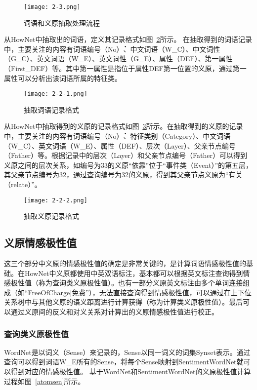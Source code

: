 \begin{figure}[htp]
\centering
\texttt{[image: 2-3.png]}
\caption{词语和义原抽取处理流程}
\label{atom}
\end{figure}

从HowNet中抽取出的词语，定义其记录格式如图~\ref{fig2-2-1}所示。
在抽取得到的词语记录中，主要关注的内容有词语编号（No\.）、中文词语（W\_C）、中文词性（G\_C）、英文词语（W\_E）、英文词性（G\_E）、属性（DEF）、第一属性（First\_DEF）等。其中第一属性是指位于属性DEF第一位置的义原，通过第一属性可以分析出该词语所属的特征类。

\begin{figure}[htp]
\centering
\texttt{[image: 2-2-1.png]}
\caption{抽取词语记录格式}
\label{fig2-2-1}
\end{figure}

从HowNet中抽取得到的义原的记录格式如图~\ref{fig2-2-2}所示。在抽取得到的义原的记录中，主要关注的内容有词语编号（No\.）、特征类别（Category）、中文词语（W\_C）、英文词语（W\_E）、属性（DEF）、层次（Layer）、父亲节点编号（Father）等。根据记录中的层次（Layer）和父亲节点编号（Father）可以得到义原之间的层次关系，如编号为33的义原“依靠”位于“事件类（Event）”的第五层，其父亲节点编号为32，通过查询编号为32的义原，得到其父亲节点义原为“有关（relate）”。

\begin{figure}[htp]
\centering
\texttt{[image: 2-2-2.png]}
\caption{抽取义原记录格式}
\label{fig2-2-2}
\end{figure}

\subsection{义原情感极性值}
这三个部分中义原的情感极性值的确定是非常关键的，是计算词语情感极性值的基础。在HowNet中义原都使用中英双语标注，基本都可以根据英文标注查询得到情感极性值（称为查询类义原极性值）。也有一部分义原英文标注由多个单词连接组成（如“FreeOfCharge$ | $免费”），无法直接查询得到情感极性值，可以通过在上下位关系树中与其他义原的语义距离进行计算获得（称为计算类义原极性值）。最后可以通过义原间的反义和对义关系对计算出的义原情感极性值进行校正。

\subsubsection{查询类义原极性值}
WordNet是以词义（Sense）来记录的，Sense以同一词义的词集Synset表示。通过查询可以得到词语W\_E所有的Sense，将每个Sense映射到SentimentWordNet就可以得到对应的情感极性值。
基于WordNet和SentimentWordNet的义原极性值计算过程如图~\ref{atomsen}所示。


